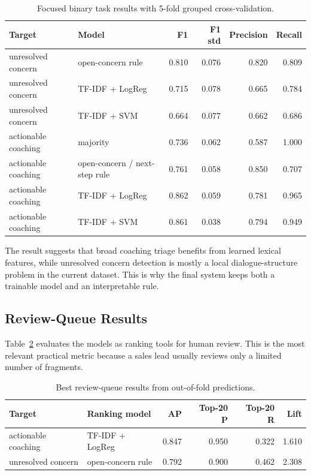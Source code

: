 \documentclass{article}
\begin{document}
\begin{table}[!tbh]
    \centering
    \begin{tabular}{llrrrr}
        \toprule
        Target & Model & F1 & F1 std & Precision & Recall \\
        \midrule
        unresolved concern & open-concern rule & 0.810 & 0.076 & 0.820 & 0.809 \\
        unresolved concern & TF-IDF + LogReg & 0.715 & 0.078 & 0.665 & 0.784 \\
        unresolved concern & TF-IDF + SVM & 0.664 & 0.077 & 0.662 & 0.686 \\
        actionable coaching & majority & 0.736 & 0.062 & 0.587 & 1.000 \\
        actionable coaching & open-concern / next-step rule & 0.761 & 0.058 & 0.850 & 0.707 \\
        actionable coaching & TF-IDF + LogReg & 0.862 & 0.059 & 0.781 & 0.965 \\
        actionable coaching & TF-IDF + SVM & 0.861 & 0.038 & 0.794 & 0.949 \\
        \bottomrule
    \end{tabular}
    \caption{Focused binary task results with 5-fold grouped cross-validation.}
    \label{tab:focused-results}
\end{table}

The result suggests that broad coaching triage benefits from learned lexical features, while unresolved concern detection is mostly a local dialogue-structure problem in the current dataset. This is why the final system keeps both a trainable model and an interpretable rule.

\subsection{Review-Queue Results}
Table~\ref{tab:queue-results} evaluates the models as ranking tools for human review. This is the most relevant practical metric because a sales lead usually reviews only a limited number of fragments.

\begin{table}[!tbh]
    \centering
    \begin{tabular}{llrrrr}
        \toprule
        Target & Ranking model & AP & Top-20 P & Top-20 R & Lift \\
        \midrule
        actionable coaching & TF-IDF + LogReg & 0.847 & 0.950 & 0.322 & 1.610 \\
        unresolved concern & open-concern rule & 0.792 & 0.900 & 0.462 & 2.308 \\
        \bottomrule
    \end{tabular}
    \caption{Best review-queue results from out-of-fold predictions.}
    \label{tab:queue-results}
\end{table}
\end{document}
